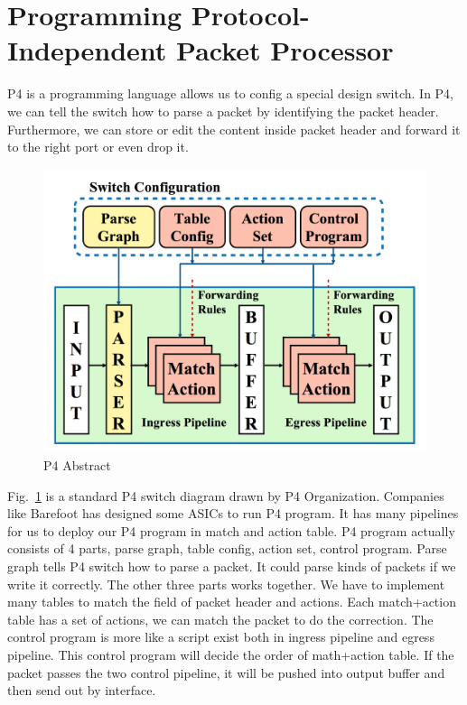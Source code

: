 \section{Programming Protocol-Independent Packet Processor} \label{sec:p4}

P4 is a programming language allows us to config a special design switch. In P4, we can tell the switch how to parse a packet by identifying the packet header. Furthermore, we can store or edit the content inside packet header and forward it to the right port or even drop it. 

\begin{figure}[tbh]
    \centering
    \includegraphics[width=.50\textwidth]{fig/p4.png}
    \caption{P4 Abstract~\cite{BDGI+14}}
    \label{p4}
\end{figure}

Fig.~\ref{p4} is a standard P4 switch diagram drawn by P4 Organization. Companies like Barefoot has designed some ASICs to run P4 program. It has many pipelines for us to deploy our P4 program in match and action table. P4 program actually consists of 4 parts, parse graph, table config, action set, control program. Parse graph tells P4 switch how to parse a packet. It could parse kinds of packets if we write it correctly. The other three parts works together. We have to implement many tables to match the field of packet header and actions. Each match+action table has a set of actions, we can match the packet to do the correction. The control program is more like a script exist both in ingress pipeline and egress pipeline. This control program will decide the order of math+action table. If the packet passes the two control pipeline, it will be pushed into output buffer and then send out by interface.